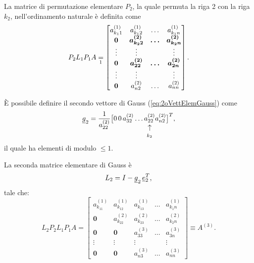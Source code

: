 La matrice di permutazione elementare $P_2$, la quale permuta la riga 2 con la riga $k_2$, nell'ordinamento naturale è definita come
\begin{equation*}
    P_2 L_1 P_1 A \underset{\footnotemark}{=}
    \begin{bmatrix}
        a_{k_11}^{(1)} & a_{k_12}^{(1)} & \hdots & a_{k_1n}^{(1)}\\
        \boldsymbol 0 & \boldsymbol{a_{k_22}^{(2)}} & \boldsymbol\hdots & \boldsymbol{a_{k_2n}^{(2)}}\\
        \boldsymbol\vdots & \vdots & & \vdots\\
        \boldsymbol 0 & \boldsymbol{a_{22}^{(2)}} & \boldsymbol\hdots & \boldsymbol{a_{2n}^{(2)}}\\
        \boldsymbol\vdots & \vdots & & \vdots\\
        \boldsymbol 0 & a_{n2}^{(2)} & \hdots & a_{nn}^{(2)}
    \end{bmatrix}.
\end{equation*}

È possibile definire il secondo vettore di Gauss (\ref{eq:2oVettElemGauss}) come
\begin{equation*}
    \uline g_2 = \frac{1}{a_{22}^{(2)}}\big[0\, 0\, a_{32}^{(2)}\hdots\vrightarrowup{a_{22}^{(2)}}{k_2} a_{n2}^{(2)}\big]^T,
\end{equation*}
il quale ha elementi di modulo $\leq 1$.

La seconda matrice elementare di Gauss è
\begin{equation*}
    L_2 = I - \uline g_2\, \uline e_2^T,
\end{equation*}
tale che:
\begin{equation*}
    L_2 P_2 L_1 P_1 A = 
    \begin{bmatrix}
        a_{k_11}^{(1)} & a_{k_12}^{(1)} & a_{k_13}^{(1)} & \hdots & a_{k_1n}^{(1)}\\
        \boldsymbol 0 & a_{k_22}^{(2)} & a_{k_23}^{(2)} & \hdots & a_{k_2n}^{(2)}\\
        \boldsymbol 0 & \boldsymbol 0 & a_{33}^{(3)} & \hdots & a_{3n}^{(3)}\\
        \boldsymbol\vdots & \boldsymbol\vdots & \vdots & &\vdots\\
        \boldsymbol 0 & \boldsymbol 0 & a_{n3}^{(3)} & \hdots & a_{nn}^{(3)}
    \end{bmatrix}\equiv A^{(3)}.
\end{equation*}

